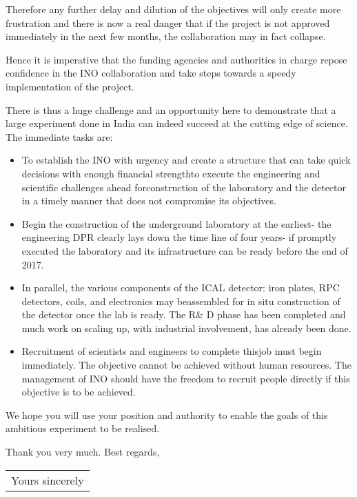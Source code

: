 Therefore any further delay and dilution of the objectives will only
create more frustration and there is now a real danger that if the project
is not approved immediately in the next few months, the collaboration may
in fact collapse.


Hence it is imperative that the funding agencies and autho\-rities in charge
repose confidence in the INO collaboration and take steps towards a speedy
implementation of the project.

There is thus a huge challenge and an opportunity here to demonstrate that
a large experiment done in India can indeed succeed at the cutting edge of
science. The immediate tasks are:

\begin{itemize}
\item To establish the INO with urgency and create a structure that can take
quick decisions with enough financial strength\break to execute the engineering
and scientific challenges ahead for\break construction of the laboratory and the
detector in a timely manner that does not compromise its objectives.

\item Begin the construction of the underground laboratory at the earliest-
the engineering DPR clearly lays down the time line of four years- if
promptly executed the laboratory and its infrastructure can be ready
before the end of 2017.

\item In parallel, the various components of the ICAL detector: iron plates,
RPC detectors, coils, and electronics may be\break assembled for in situ
construction of the detector once the lab is ready. The R\& D phase has
been completed and much work on scaling up, with industrial involvement,
has already been done.

\item Recruitment of scientists and engineers to complete this\break job must begin
immediately. The objective cannot be achieved without human resources.
The management of INO should have the freedom to recruit people directly
if this objective is to be achieved.
\end{itemize}
\newpage

We hope you will use your position and authority to enable the goals of
this ambitious experiment to be realised.

Thank you very much. Best regards,

\begin{flushright}
\begin{tabular}{c}
Yours sincerely \phantom{WWW} 
\end{tabular}
\end{flushright}


